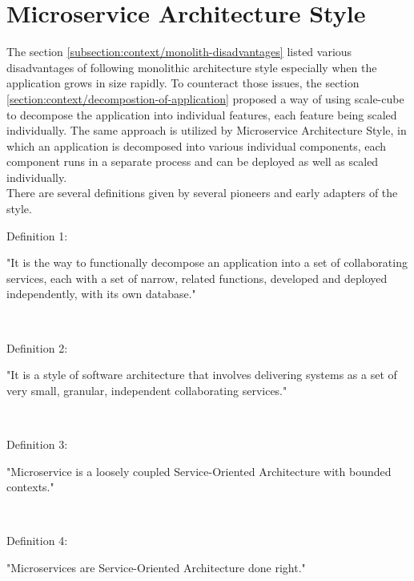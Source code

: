 \section{Microservice Architecture Style}\label{section:context/microservices_architecture_style}
The section \ref{subsection:context/monolith-disadvantages} listed various disadvantages of following monolithic architecture style especially when the application grows in size rapidly. To counteract those issues, the section \ref{section:context/decompostion-of-application} proposed a way of using scale-cube to decompose the application into individual features, each feature being scaled individually. The same approach is utilized by Microservice Architecture Style, in which an application is decomposed into various individual components, each component runs in a separate process and can be deployed as well as scaled individually.
\\
There are several definitions given by several pioneers and early adapters of the style.
\\
\begin{shaded}Definition 1: \cite{Richardson:2014ac} \end{shaded}
"It is the way to functionally decompose an application into a set of collaborating services, each with a set of narrow, related functions, developed and deployed independently, with its own database."

\\
\begin{shaded}Definition 2: \cite{Wootton:2014aa}\end{shaded}
"It is a style of software architecture that involves delivering systems as a set of very small, granular, independent collaborating services."


\\
\begin{shaded}Definition 3: \cite{Cockcroft:2015aa}\end{shaded}
"Microservice is a loosely coupled Service-Oriented Architecture with bounded contexts."


\\
\begin{shaded}Definition 4: \cite{Fowler:2014aa}\cite{Radchenko:2015aa}\end{shaded}
"Microservices are Service-Oriented Architecture done right."


